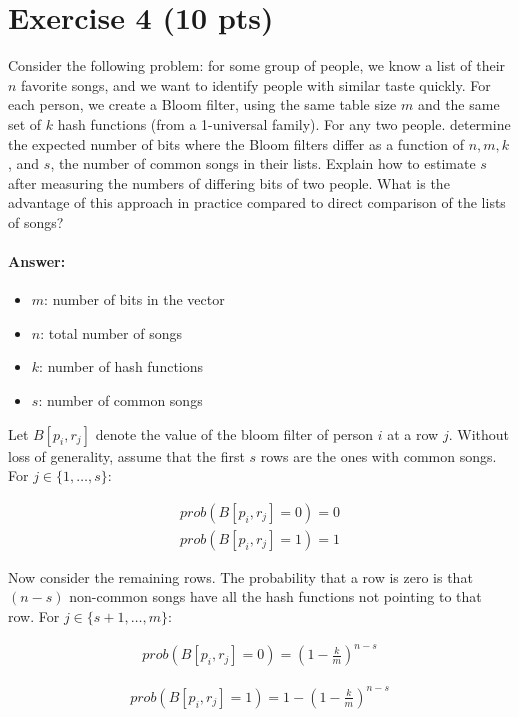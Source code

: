 \documentclass[a4paper]{article}
\begin{document}
\section{Exercise 4 (10 pts)}

\noindent Consider the following problem: for some group of people, we know a list of their $n$ favorite songs, and we want to identify people with similar taste quickly. For each person, we create a Bloom filter, using the same table size $m$ and the same set of $k$ hash functions (from a 1-universal family). For any two people. determine the expected number of bits where the Bloom filters differ as a function of $n, m, k$, and $s$, the number of common songs in their lists. Explain how to estimate $s$ after measuring the numbers of differing bits of two people. What is the advantage of this approach in practice compared to direct comparison of the lists of songs?

\paragraph{Answer:}

\begin{itemize}
\item $m$: number of bits in the vector
\item $n$: total number of songs
\item $k$: number of hash functions
\item $s$: number of common songs
\end{itemize}

Let $B[p_i, r_j]$ denote the value of the bloom filter of person $i$ at a row $j$.
Without loss of generality, assume that the first $s$ rows are the ones with common songs. For $j \in \{1, \ldots, s\}$:

\begin{align*}
{prob}(B[p_i, r_j] = 0) = 0 \\
{prob}(B[p_i, r_j] = 1) = 1
\end{align*}


Now consider the remaining rows. The probability that a row is zero is that $(n-s)$ non-common songs have all the hash functions not pointing to that row. For $j \in \{s+1, \ldots, m\}$:

\begin{align*}
{prob}(B[p_i, r_j] = 0) = \left ( 1 - \frac{k}{m} \right )^{n-s}
\end{align*}

\begin{align*}
{prob}(B[p_i, r_j] = 1) = 1 - \left ( 1 - \frac{k}{m} \right )^{n-s}
\end{align*}
\end{document}
